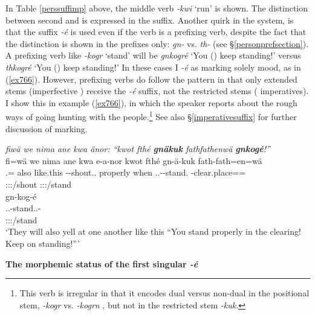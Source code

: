 In Table \ref{perssuffimp} above, the middle verb \emph{-kwi} `run' is shown. The distinction between second  and  is expressed in the suffix. Another quirk in the system, is that the suffix \emph{-é} is used even if the verb is a prefixing verb, despite the fact that the  distinction is shown in the prefixes only: \emph{gn-} \Ssg{} vs. \emph{th-} \Snsg{} (see \S\ref{personprefsection}). A prefixing verb like \emph{-kogr} `stand' will be \emph{gnkogré} `You (\Sg) keep standing!' versus \emph{thkogré} `You (\Pl) keep standing!' In these cases I  \emph{-é} as marking solely  mood, as in (\ref{ex766}). However, prefixing verbs do follow the pattern in that only extended stems (imperfective ) receive the \emph{-é} suffix, not the restricted stems ( imperatives). I show this in example (\ref{ex766}), in which the speaker reports about the rough ways of going hunting with the  people.\footnote{This verb is irregular in that it encodes dual versus non-dual in the positional stem, \emph{-kogr} \Ndu{} vs. \emph{-kogrn} \Du{}, but not in the restricted stem \emph{-kuk}.} See also \S\ref{imperativesuffix} for further discussion of  marking.

\begin{exe}
	\ex \emph{fiwä we nima ane kwa änor: ``kwot fthé \textbf{gnäkuk} fathfathenwä \textbf{gnkogé}!''}\\
	\glll fi=wä we nima ane kwa e-a-nor kwot fthé gn-ä-kuk fath-fath=en=wä\\
	\Third.\Abs{}=\Emph{} also like.this \Dem{} \Fut{} \Stnsg-\Vc-shout.\Ext.\Ndu{} properly when \Ssg.\Bet.\Imp-\Ndu-stand.\Rs{} \Redup-clear.place=\Loc=\Emph{}\\
	{} {} {} {} {} {\footnotesize \Tpl:\Sbj:\Nonpast:\Ipfv/shout} {} {} {\footnotesize \Ssg:\Sbj:\Imp:\Pfv/stand} {}\\
	\sn
	\glll gn-kog-é\\
	\Ssg.\Bet.\Imp-stand.\Ext.\Ndu-\Imp{}\\
	{\footnotesize \Ssg:\Sbj:\Imp:\Ipfv/stand}\\
	\trans `They will also yell at one another like this ``You stand properly in the clearing! Keep on standing!'''
	\label{ex766}
\end{exe}

\noindent
\textbf{The morphemic status of the first singular \emph{-é}}\\


